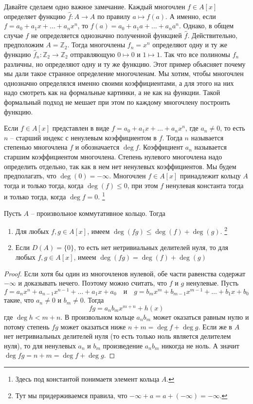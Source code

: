 \begin{remark}
Давайте сделаем одно важное замечание.
Каждый многочлен $f\in A[x]$ определяет функцию $\hat f\colon A\to A$ по правилу $a \mapsto f(a)$.
А именно, если $f = a_0 + a_1 x + \ldots + a_n x^n$, то $f(a) = a_0 + a_1 a + \ldots + a_n a^n$.
Однако, в общем случае $f$ не определяется однозначно полученной функцией $\hat f$.
Действительно, предположим $A = \mathbb Z_2$.
Тогда многочлены $f_n = x^n$ определяют одну и ту же функцию $\hat f_n \colon \mathbb Z_2 \to \mathbb Z_2$ отправляющую $0\mapsto 0$ и $1\mapsto 1$.
Так что все полиномы $f_n$ различны, но определяют одну и ту же функцию.
Этот пример объясняет почему мы дали такое странное определение многочленам.
Мы хотим, чтобы многочлен однозначно определялся именно своими коэффициентами, а для этого на них надо смотреть как на формальные картинки, а не как на функции.
Такой формальный подход не мешает при этом по каждому многочлену построить функцию.
\end{remark}

Если $f\in A[x]$ представлен в виде $f = a_0 + a_1 x + \ldots + a_n x^n$, где $a_n \neq 0$, то есть $n$ -- старший индекс с ненулевым коэффициентом в $f$.
Тогда $n$ называется степенью многочлена $f$ и обозначается $\deg f$.
Коэффициент $a_n$ называется старшим коэффициентом многочлена.
Степень нулевого многочлена надо определить отдельно, так как в нем нет ненулевых коэффициентов.
Мы будем предполагать, что $\deg (0) = -\infty$.
Многочлен $f\in A[x]$ принадлежит кольцу $A$ тогда и только тогда, когда $\deg (f) \leqslant 0$, при этом $f$ ненулевая константа тогда и только тогда, когда $\deg f = 0$.%
\footnote{Здесь под константой понимаетя элемент кольца $A$.}

\begin{claim}
\label{claim::Degree}
Пусть $A$ -- произвольное коммутативное кольцо.
Тогда 
\begin{enumerate}
\item Для любых $f, g \in A[x]$, имеем $\deg(fg) \leqslant \deg (f) + \deg(g)$.%
\footnote{Тут мы придерживаемся правила, что $-\infty + a = a + (-\infty) = -\infty$.}

\item Если $D(A) = \{0\}$, то есть нет нетривиальных делителей нуля, то для любых $f, g \in A[x]$, имеем $\deg(fg) = \deg (f) + \deg(g)$
\end{enumerate}
\end{claim}
\begin{proof}
Если хотя бы один из многочленов нулевой, обе части равенства содержат $-\infty$ и доказывать нечего.
Поэтому можно считать, что $f$ и  $g$ ненулевые.
Пусть 
\[
f = a_n x^n + a_{n-1}x^{n-1} + \ldots + a_1 x + a_0\quad \text{и} \quad g = b_mx^m + b_{m-1}x^{m-1} + \ldots + b_1 x + b_0
\]
такие, что $a_n\neq 0$ и $b_m\neq0$.
Тогда
\[
fg = a_n b_m x^{m+n} + h(x)
\]
где $\deg h < m + n$.
В произвольном кольце $a_n b_m$ может оказаться равным нулю и потому степень $fg$ может оказаться ниже $n + m = \deg f + \deg g$.
Если же в $A$ нет нетривиальных делителей нуля (то есть только ноль является делителем нуля), то для ненулевых $a_n$ и $b_m$ произведение $a_n b_m$ никогда не ноль.
А значит $\deg fg = n + m = \deg f + \deg g$.
\end{proof}


